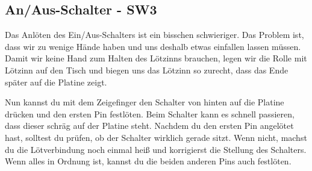 \documentclass{article}
\begin{document}
\subsection{An/Aus-Schalter - SW3}

Das Anlöten des Ein/Aus-Schalters ist ein bisschen schwieriger. Das Problem ist, dass wir zu wenige Hände haben und uns deshalb etwas einfallen lassen müssen. Damit wir keine Hand zum Halten des Lötzinns brauchen, legen wir die Rolle mit Lötzinn auf den Tisch und biegen uns das Lötzinn so zurecht, dass das Ende später auf die Platine zeigt.

Nun kannst du mit dem Zeigefinger den Schalter von hinten auf die Platine drücken und den ersten Pin festlöten. Beim Schalter kann es schnell passieren, dass dieser schräg auf der Platine steht. Nachdem du den ersten Pin angelötet hast, solltest du prüfen, ob der Schalter wirklich gerade sitzt. Wenn nicht, machst du die Lötverbindung noch einmal heiß und korrigierst die Stellung des Schalters. Wenn alles in Ordnung ist, kannst du die beiden anderen Pins auch festlöten.

\vspace{1cm}
\end{document}

